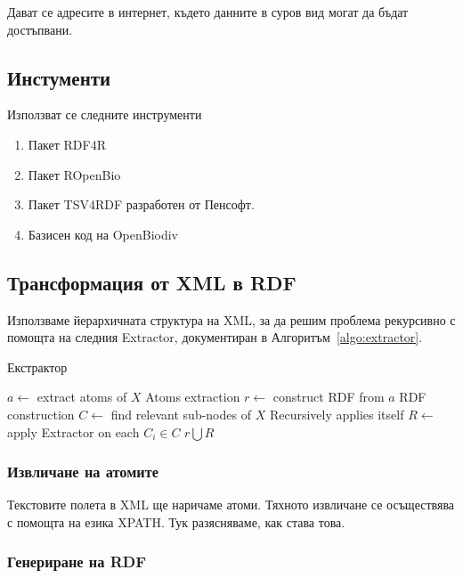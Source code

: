 Дават се адресите в интернет, където данните в суров вид могат да бъдат достъпвани.

\subsection{Инстументи}

Използват се следните инструменти

\begin{enumerate}
\item{Пакет RDF4R}
\item{Пакет ROpenBio}
\item{Пакет TSV4RDF разработен от Пенсофт.}
\item{Базисен код на OpenBiodiv}
\end{enumerate}


\subsection{Трансформация от XML в RDF}

Използваме йерархичната структура на XML, за да решим проблема рекурсивно с помощта на следния Extractor, документиран в Алгоритъм~\ref{algo:extractor}.

\begin{algorithm}
\caption{Екстрактор}
\begin{algorithmic}[1]
\State $a \leftarrow$ extract atoms of $X$
\Comment Atoms extraction
\State $r \leftarrow$ construct RDF from $a$
\Comment RDF construction
\State $C \leftarrow$ find relevant sub-nodes of $X$
\Comment Recursively applies itself
\State $R \leftarrow$ apply Extractor on each $C_i \in C$
\State \Return $r \bigcup R$
\EndProcedure
\end{algorithmic}
\label{algo:extractor}
\end{algorithm}

\subsubsection{Извличане на атомите}

Текстовите полета в XML ще наричаме атоми. Тяхното извличане се осъществява с помощта на езика XPATH. Тук разясняваме, как става това.

\subsubsection{Генериране на RDF}

